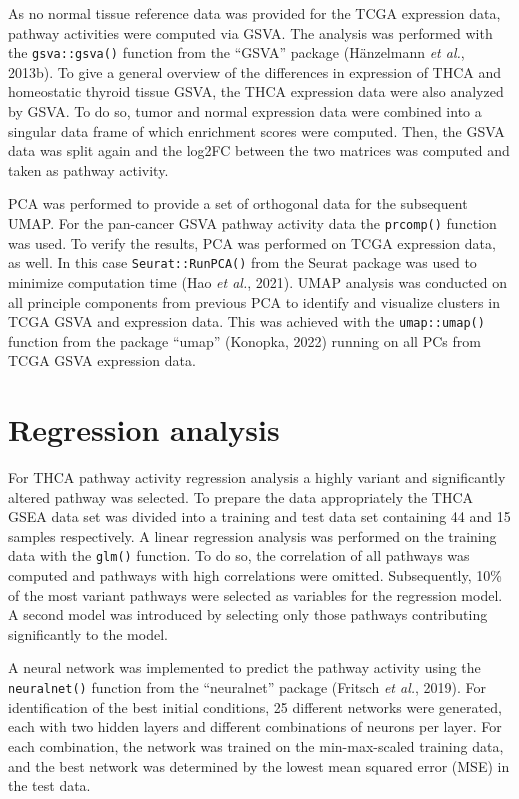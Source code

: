 \documentclass[
  11pt,
  parskip,
  oneside]{scrreprt}
\begin{document}
As no normal tissue reference data was provided for the TCGA expression
data, pathway activities were computed via GSVA. The analysis was
performed with the \texttt{gsva::gsva()} function from the ``GSVA''
package (Hänzelmann \emph{et al.}, 2013b). To give a general overview of
the differences in expression of THCA and homeostatic thyroid tissue
GSVA, the THCA expression data were also analyzed by GSVA. To do so,
tumor and normal expression data were combined into a singular data
frame of which enrichment scores were computed. Then, the GSVA data was
split again and the log2FC between the two matrices was computed and
taken as pathway activity.

PCA was performed to provide a set of orthogonal data for the subsequent
UMAP. For the pan-cancer GSVA pathway activity data the
\texttt{prcomp()} function was used. To verify the results, PCA was
performed on TCGA expression data, as well. In this case
\texttt{Seurat::RunPCA()} from the Seurat package was used to minimize
computation time (Hao \emph{et al.}, 2021). UMAP analysis was conducted
on all principle components from previous PCA to identify and visualize
clusters in TCGA GSVA and expression data. This was achieved with the
\texttt{umap::umap()} function from the package ``umap'' (Konopka, 2022)
running on all PCs from TCGA GSVA expression data.

\hypertarget{regression-analysis}{%
\section{Regression analysis}\label{regression-analysis}}

For THCA pathway activity regression analysis a highly variant and
significantly altered pathway was selected. To prepare the data
appropriately the THCA GSEA data set was divided into a training and
test data set containing 44 and 15 samples respectively. A linear
regression analysis was performed on the training data with the
\texttt{glm()} function. To do so, the correlation of all pathways was
computed and pathways with high correlations were omitted. Subsequently,
10\% of the most variant pathways were selected as variables for the
regression model. A second model was introduced by selecting only those
pathways contributing significantly to the model.

A neural network was implemented to predict the pathway activity using
the \texttt{neuralnet()} function from the ``neuralnet'' package
(Fritsch \emph{et al.}, 2019). For identification of the best initial
conditions, 25 different networks were generated, each with two hidden
layers and different combinations of neurons per layer. For each
combination, the network was trained on the min-max-scaled training
data, and the best network was determined by the lowest mean squared
error (MSE) in the test data.
\end{document}
